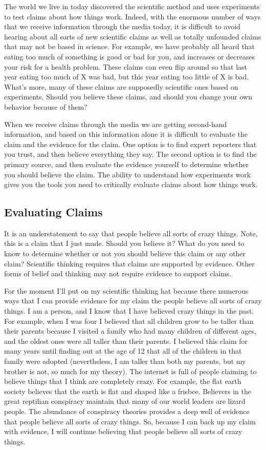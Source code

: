 \documentclass[]{book}
\theoremstyle{definition}
\theoremstyle{definition}
\theoremstyle{remark}
\begin{document}
The world we live in today discovered the scientific method and uses
experiments to test claims about how things work. Indeed, with the
enormous number of ways that we receive information through the media
today, it is difficult to avoid hearing about all sorts of new
scientific claims as well as totally unfounded claims that may not be
based in science. For example, we have probably all heard that eating
too much of something is good or bad for you, and increases or decreases
your risk for a health problem. These claims can even flip around so
that last year eating too much of X was bad, but this year eating too
little of X is bad. What's more, many of these claims are supposedly
scientific ones based on experiments. Should you believe these claims,
and should you change your own behavior because of them?

When we receive claims through the media we are getting second-hand
information, and based on this information alone it is difficult to
evaluate the claim and the evidence for the claim. One option is to find
expert reporters that you trust, and then believe everything they say.
The second option is to find the primary source, and then evaluate the
evidence yourself to determine whether you should believe the claim. The
ability to understand how experiments work gives you the tools you need
to critically evaluate claims about how things work.

\subsection{Evaluating Claims}\label{evaluating-claims}

It is an understatement to say that people believe all sorts of crazy
things. Note, this is a claim that I just made. Should you believe it?
What do you need to know to determine whether or not you should believe
this claim or any other claim? Scientific thinking requires that claims
are supported by evidence. Other forms of belief and thinking may not
require evidence to support claims.

For the moment I'll put on my scientific thinking hat because there
numerous ways that I can provide evidence for my claim the people
believe all sorts of crazy things. I am a person, and I know that I have
believed crazy things in the past. For example, when I was four I
believed that all children grow to be taller than their parents because
I visited a family who had many children of different ages, and the
oldest ones were all taller than their parents. I believed this claim
for many years until finding out at the age of 12 that all of the
children in that family were adopted (nevertheless, I am taller than
both my parents, but my brother is not, so much for my theory). The
internet is full of people claiming to believe things that I think are
completely crazy. For example, the flat earth society believes that the
earth is flat and shaped like a frisbee. Believers in the great
reptilian conspiracy maintain that many of our world leaders are lizard
people. The abundance of conspiracy theories provides a deep well of
evidence that people believe all sorts of crazy things. So, because I
can back up my claim with evidence, I will continue believing that
people believe all sorts of crazy things.
\end{document}
